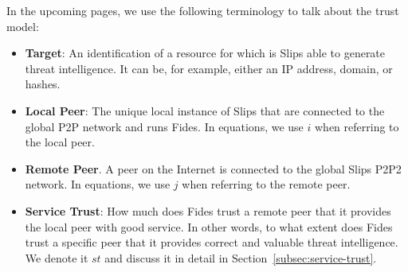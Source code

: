 \vspace{1cm}

\noindent
In the upcoming pages, we use the following terminology to talk about the trust model:

\begin{itemize}

\item \textbf{Target}: An identification of a resource for which is Slips able to generate threat intelligence. It can be, for example, either an IP address, domain, or hashes.

\item \textbf{Local Peer}: The unique local instance of Slips that are connected to the global P2P network and runs Fides. In equations, we use $i$ when referring to the local peer.

\item \textbf{Remote Peer}. A peer on the Internet is connected to the global Slips P2P2 network. In equations, we use $j$ when referring to the remote peer.

\item \textbf{Service Trust}: How much does Fides trust a remote peer that it provides the local peer with good service. In other words, to what extent does Fides trust a specific peer that it provides correct and valuable threat intelligence. We denote it $st$ and discuss it in detail in Section~\ref{subsec:service-trust}.

\end{itemize}











